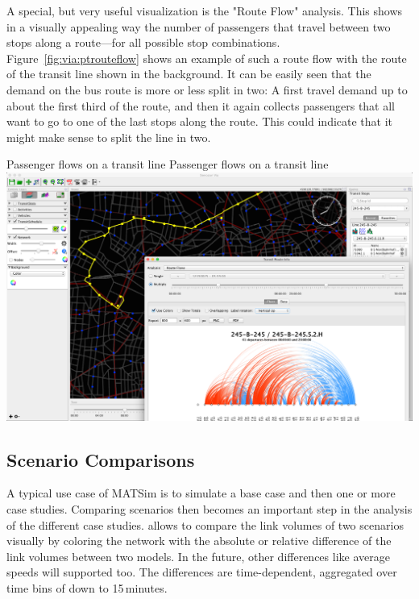 A special, but very useful visualization is the "Route Flow" analysis. This
shows in a visually appealing way the number of passengers that travel between
two stops along a route---for all possible stop combinations.
Figure~\ref{fig:via:ptrouteflow} shows an example of such a route flow with the
route of the transit line shown in the background.
It can be easily seen that the demand on the bus route is more or less split in two: A
first travel demand up to about the first third of the route, and then it again
collects passengers that all want to go to one of the last stops along the
route. This could indicate that it might make sense to split the line in two.

\createfigure%
{Passenger flows on a transit line}%
{Passenger flows on a transit line}%
{\label{fig:via:ptrouteflow}}%
{\includegraphics[width=1.\textwidth,angle=0]{./extending/figures/via/ptrouteflows}}%
{}

\subsection{Scenario Comparisons}
A typical use case of MATSim is to simulate a base case and then one or more
case studies. Comparing scenarios then becomes an important step in the analysis
of the different case studies. \Via{} allows to compare the link volumes of two
scenarios visually by coloring the network with the absolute or relative
difference of the link volumes between two models. In the future, other
differences like average speeds will supported too. The differences are
time-dependent, aggregated over time bins of down to 15\,minutes.

